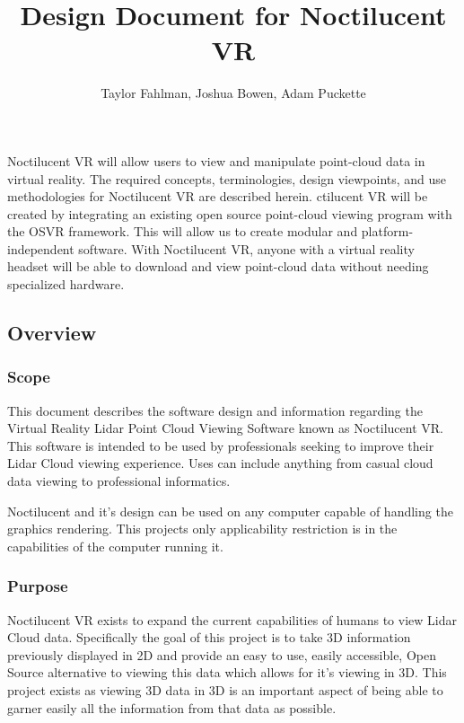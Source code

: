 \title {Design Document for Noctilucent VR}
\author {Taylor Fahlman, Joshua Bowen, Adam Puckette}

\maketitle

\abstract

Noctilucent VR will allow users to view and manipulate point-cloud data in virtual reality. 
The required concepts, terminologies, design viewpoints, and use methodologies for Noctilucent VR are described herein. 
ctilucent VR will be created by integrating an existing open source point-cloud viewing program with the OSVR framework. 
This will allow us to create modular and platform-independent software. 
With Noctilucent VR, anyone with a virtual reality headset will be able to download and view point-cloud data without needing specialized hardware.

\subsection{Overview}
\subsubsection{Scope}

This document describes the software design and information regarding the Virtual Reality Lidar Point Cloud Viewing Software known as Noctilucent VR.
This software is intended to be used by professionals seeking to improve their Lidar Cloud viewing experience.
Uses can include anything from casual cloud data viewing to professional informatics.

Noctilucent and it's design can be used on any computer capable of handling the graphics rendering.
This projects only applicability restriction is in the capabilities of the computer running it.

\subsubsection{Purpose}

Noctilucent VR exists to expand the current capabilities of humans to view Lidar Cloud data.
Specifically the goal of this project is to take 3D information previously displayed in 2D and provide an easy to use, easily accessible, Open Source alternative to viewing this data which allows for it's viewing in 3D.
This project exists as viewing 3D data in 3D is an important aspect of being able to garner easily all the information from that data as possible.

